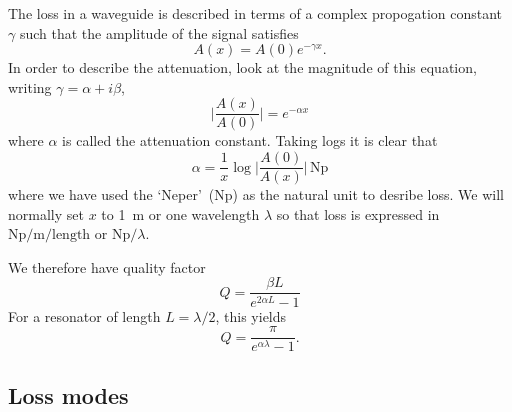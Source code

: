 The loss in a waveguide is described in terms of a complex propogation
constant~\cite{Collin2007} $\gamma$ such that the amplitude of the signal
satisfies
\begin{equation}
  A(x) = A(0)e^{-\gamma x}.
\end{equation}
In order to describe the attenuation, look at the magnitude of this equation,
writing $\gamma = \alpha +i\beta$,
\begin{equation}
  \lvert\frac{A(x)}{A(0)}\rvert = e^{-\alpha x}
\end{equation}
where $\alpha$ is called the attenuation constant. Taking logs it is clear that
\begin{equation}
  \alpha = \frac{1}{x}\log\lvert\frac{A(0)}{A(x)}\rvert\,\si{\neper}
\end{equation}
where we have used the `Neper'~(\si{\neper})  as the natural unit
to desribe loss. We will normally set $x$ to 
\SI{1}{\meter} or one wavelength $\lambda$ so that loss is expressed in
$\si{\neper \per \meter}/\mathrm{length}$ or $\si{\neper}/\lambda$.
%
%

We therefore have quality factor
\begin{equation}
  Q = \frac{\beta L}{e^{2\alpha L} -1}
\end{equation}
For a resonator of length $L = \lambda/2$, this yields
\begin{equation}
  Q = \frac{\pi}{e^{\alpha \lambda} - 1}.
\end{equation}


\subsection{Loss modes}


